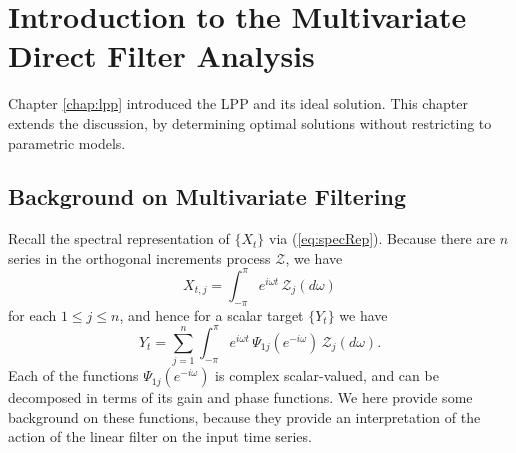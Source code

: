 \documentclass[a4paper]{book}
\begin{document}


\chapter{Introduction to the Multivariate Direct Filter Analysis}
\label{chap:basic}

Chapter \ref{chap:lpp} introduced the LPP and its ideal solution.  This chapter
 extends the discussion, by determining optimal solutions without restricting
 to parametric models.

\section{Background on Multivariate Filtering}

 Recall the spectral representation of $\{ X_t \}$ via (\ref{eq:specRep}).  Because 
 there are $n$ series in the orthogonal increments process $\mathcal{Z}$, we have
\[
  X_{t,j} = \int_{-\pi}^{\pi} e^{i \omega t} \, \mathcal{Z}_j (d\omega )
\] 
 for each $1 \leq j \leq n$, and hence for a scalar target $\{ Y_t \}$ we have
\begin{equation}
 \label{eq:spec-rep.partial}
  Y_t = \sum_{j=1}^n  \int_{-\pi}^{\pi} e^{i \omega  t} \, \Psi_{1 j} (e^{-i \omega }) \,
   \mathcal{Z}_j (d\omega ).
\end{equation}
  Each of the functions $\Psi_{1j} (e^{-i \omega })$ is complex scalar-valued, and
 can be decomposed in terms of its gain and phase functions.   We here provide some
 background on these functions, because they provide an interpretation of the action
 of the linear filter on the input time series.
\end{document}
